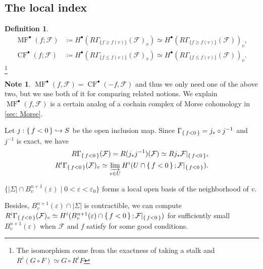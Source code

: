 \documentclass[a4paper,dvipdfmx,reqno,12pt]{amsart}
\theoremstyle{definition}
\newtheorem{Def}[Thm]{Definition}
\newtheorem{Note}[Thm]{Note}
\newcommand{\deq}{\coloneqq}
\newcommand{\vep}{\varepsilon}%
\newcommand{\mcal}[1]{\mathcal{#1}}%
\newcommand{\opn}[1]{\operatorname{#1}}
\newcommand{\hookto}{\hookrightarrow}
\numberwithin{equation}{section}
\begin{document}
\subsection{The local index}





\begin{Def}

  \begin{align}
    \opn{MF}^{\bullet}(f;\mcal{F})
     & \deq H^{\bullet}(R\Gamma_{\{f\geq f(v)\}}(\mcal{F})_v) \simeq
    H^{\bullet}(R\Gamma_{\{f\geq f(v)\}}(\mcal{F}))_v,               \\
    \opn{CF}^{\bullet}(f;\mcal{F})
     & \deq H^{\bullet}(R\Gamma_{\{f\leq f(v)\}}(\mcal{F})_v) \simeq
    H^{\bullet}(R\Gamma_{\{f\leq f(v)\}}(\mcal{F}))_v.
  \end{align}
  \footnote{The isomorphism come from the exactness of taking
    a stalk and $R^{i}(G\circ F)\simeq G\circ R^{i}F$}

\end{Def}

\begin{Note}
  $\opn{MF}^{\bullet}(f,\mcal{F})=\opn{CF}^{\bullet}(-f,\mcal{F})$
  and thus we only need one of the above two, but we use both of it
  for comparing related notions.
  We explain $\opn{MF}^{\bullet}(f,\mcal{F})$ is a certain analog
  of a cochain complex of Morse cohomology in \cref{sec: Morse}.
\end{Note}



Let $j:\set{f<0}\hookto S$ be the open inclusion map.
Since $\Gamma_{\set{f<0}}=j_*\circ j^{-1}$
and $j^{-1}$ is exact, we have
\begin{align}
  R\Gamma_{\set{f<0}}(\mcal{F})
  = R (j_*j^{-1})(\mcal{F})\simeq Rj_* \mcal{F}|_{\set{f<0}}, \\
  R^{i}\Gamma_{\set{f<0}}(\mcal{F})_v
  \simeq \varinjlim_{v\in U} H^{i}(U\cap\set{f<0};\mcal{F}|_{\set{f<0}}).
\end{align}

$\{|\Sigma|\cap B^{n+1}_{v}(\vep)\mid 0<\vep<\vep_0\}$ forms a local
open basis of the neighborhood of $v$.

Besides, $B_v^{n+1}(\vep)\cap |\Sigma|$ is contractible,
we can compute
$R^{i}\Gamma_{\set{f<0}}(\mcal{F})_v
  \simeq H^{i}(B_v^{n+1}(\vep)\cap\set{f<0};\mcal{F}|_{\set{f<0}})$
for sufficiently small $B_v^{n+1}(\vep)$ when
$\mcal{F}$ and $f$ satisfy for some good conditions.
\end{document}
